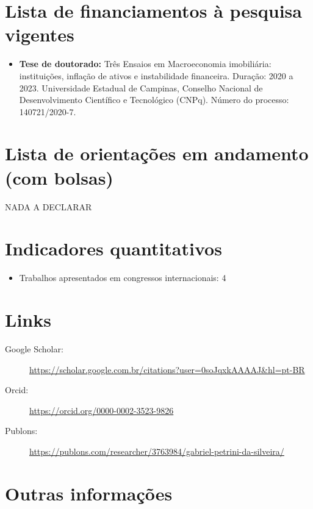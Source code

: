 \documentclass[11pt,a4paper]{article}
\begin{document}
\section{Lista de financiamentos à pesquisa vigentes}

\begin{itemize}
	\item \textbf{Tese de doutorado:} Três Ensaios em Macroeconomia imobiliária: instituições, inflação de ativos e instabilidade financeira. Duração: 2020 a 2023. Universidade Estadual de Campinas, Conselho Nacional de Desenvolvimento Científico e Tecnológico (CNPq). Número do processo: 140721/2020-7.
\end{itemize}

\section{Lista de orientações em andamento (com bolsas)}

NADA A DECLARAR

\section{Indicadores quantitativos}

\begin{itemize}
	\item Trabalhos apresentados em congressos internacionais: 4
\end{itemize}

\section{Links}

\begin{description}
	\item[Google Scholar:] \url{https://scholar.google.com.br/citations?user=0soJqxkAAAAJ&hl=pt-BR}
	\item[Orcid:] \url{https://orcid.org/0000-0002-3523-9826}
	\item[Publons:] \url{https://publons.com/researcher/3763984/gabriel-petrini-da-silveira/}
\end{description}

\section{Outras informações}
\end{document}
